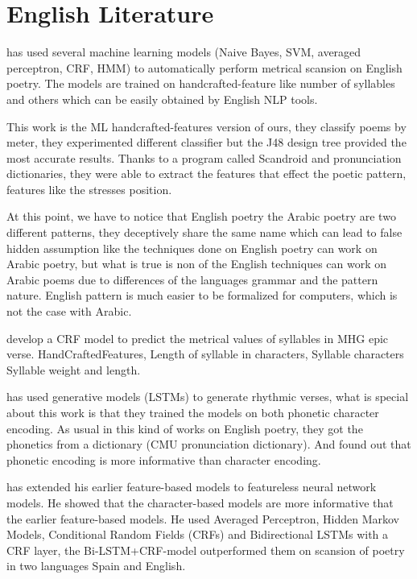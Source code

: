 \section{English Literature}

\cite{Agirrezabal2016MachineLearningMetricalAnalysis} has used several machine learning models
(Naive Bayes, SVM, averaged perceptron, CRF, HMM) to automatically perform metrical scansion on
English poetry.  The models are trained on handcrafted-feature like number of syllables and others
which can be easily obtained by English NLP tools.

\cite{Tanasescu2016AutomaticClassificationOfPoetryMeterRhyme} This work is the ML
handcrafted-features version of ours, they classify poems by meter, they experimented different
classifier but the J48 design tree provided the most accurate results. Thanks to a program called
Scandroid and pronunciation dictionaries, they were able to extract the features that effect the
poetic pattern, features like the stresses position.

At this point, we have to notice that English poetry the Arabic poetry are two different patterns,
they deceptively share the same name which can lead to false hidden assumption like the techniques
done on English poetry can work on Arabic poetry, but what is true is non of the English techniques
can work on Arabic poems due to differences of the languages grammar and the pattern nature. English
pattern is much easier to be formalized for computers, which is not the case with Arabic.

\cite{Estes2016SupervisedMachineLearningForHybridMeter} develop a CRF model to predict the metrical
values of syllables in MHG epic verse. HandCraftedFeatures, Length of syllable in characters,
Syllable characters Syllable weight and length.



\cite{Hopkins2017AutomaticallyGeneratingRhythmic} has used generative models (LSTMs) to generate
rhythmic verses, what is special about this work is that they trained the models on both phonetic
character encoding. As usual in this kind of works on English poetry, they got the phonetics from a
dictionary (CMU pronunciation dictionary).  And found out that phonetic encoding is more informative
than character encoding.

\cite{Agirrezabal2017ComparisonFeatureBasedNeural} has extended his earlier feature-based models to
featureless neural network models. He showed that the character-based models are more informative
that the earlier feature-based models. He used Averaged Perceptron, Hidden Markov Models,
Conditional Random Fields (CRFs) and Bidirectional LSTMs with a CRF layer, the Bi-LSTM+CRF-model
outperformed them on scansion of poetry in two languages Spain and English.



